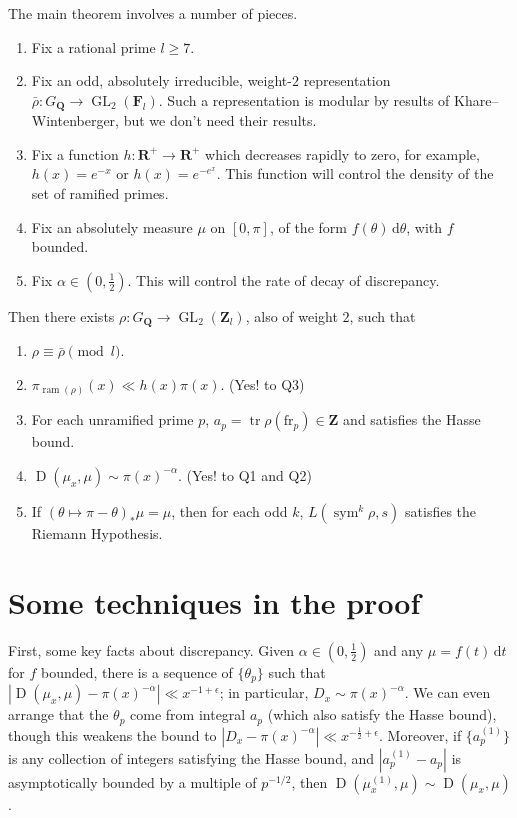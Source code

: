 \documentclass{article}
\DeclareMathOperator{\D}{D}
\DeclareMathOperator{\GL}{GL}
\DeclareMathOperator{\ram}{ram}
\DeclareMathOperator{\sym}{sym}
\DeclareMathOperator{\tr}{tr}
\newcommand{\bF}{\mathbf{F}}
\newcommand{\bQ}{\mathbf{Q}}
\newcommand{\bR}{\mathbf{R}}
\newcommand{\bZ}{\mathbf{Z}}
\newcommand{\dd}{\mathrm{d}}
\newcommand{\frob}{\mathrm{fr}}
\begin{document}
The main theorem involves a number of pieces.
\begin{enumerate}
\item
Fix a rational prime $l\geqslant 7$. 

\item
Fix an odd, absolutely irreducible, weight-$2$ representation 
$\bar\rho\colon G_\bQ \to \GL_2(\bF_l)$. Such a representation is modular by 
results of Khare--Wintenberger, but we don't need their results. 

\item
Fix a function $h\colon \bR^+ \to \bR^+$ which decreases rapidly to zero, for 
example, $h(x) = e^{-x}$ or $h(x) = e^{-e^x}$. This function will control the 
density of the set of ramified primes. 

\item
Fix an absolutely measure $\mu$ on $[0,\pi]$, of the form 
$f(\theta)\, \dd \theta$, with $f$ bounded. 

\item
Fix $\alpha\in \left(0,\frac 1 2\right)$. This will control the rate of decay 
of discrepancy. 
\end{enumerate}
Then there exists $\rho\colon G_\bQ \to \GL_2(\bZ_l)$, also of weight $2$, 
such that 
\begin{enumerate}
\item
$\rho\equiv \bar\rho\pmod l$. 

\item
$\pi_{\ram(\rho)}(x) \ll h(x) \pi(x)$. (Yes! to Q3)

\item
For each unramified prime $p$, $a_p = \tr \rho(\frob_p)\in \bZ$ and satisfies 
the Hasse bound. 

\item
$\D(\mu_x,\mu) \sim \pi(x)^{-\alpha}$. (Yes! to Q1 and Q2)

\item
If $(\theta\mapsto \pi - \theta)_\ast \mu = \mu$, then for each odd 
$k$, $L(\sym^k \rho,s)$ satisfies the Riemann Hypothesis. 
\end{enumerate}





\section{Some techniques in the proof}

First, some key facts about discrepancy. 
Given $\alpha\in \left(0,\frac 1 2\right)$ and any $\mu = f(t)\, \dd t$ for $f$ 
bounded, there is a sequence of $\{\theta_p\}$ such that 
$|\D(\mu_x,\mu) - \pi(x)^{-\alpha}| \ll x^{-1+\epsilon}$; in particular, 
$D_x \sim \pi(x)^{-\alpha}$. We can even arrange that the $\theta_p$ come 
from integral $a_p$ (which also satisfy the Hasse bound), though this weakens 
the bound to $|D_x - \pi(x)^{-\alpha}| \ll x^{-\frac 1 2+\epsilon}$. Moreover, 
if $\{a_p^{(1)}\}$ is any collection of integers satisfying the Hasse bound, and 
$|a_p^{(1)} - a_p|$ is asymptotically bounded by a multiple of $p^{-1/2}$, then 
$\D(\mu_x^{(1)},\mu) \sim \D(\mu_x,\mu)$. 
\end{document}
